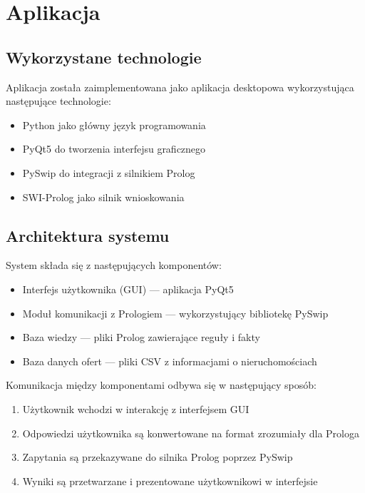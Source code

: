 \section{Aplikacja}

\subsection{Wykorzystane technologie}

Aplikacja została zaimplementowana jako aplikacja desktopowa wykorzystująca następujące technologie:
\begin{itemize}
    \item Python jako główny język programowania
    \item PyQt5 do tworzenia interfejsu graficznego
    \item PySwip do integracji z silnikiem Prolog
    \item SWI-Prolog jako silnik wnioskowania
\end{itemize}

\subsection{Architektura systemu}

System składa się z następujących komponentów:
\begin{itemize}
    \item Interfejs użytkownika (GUI) — aplikacja PyQt5
    \item Moduł komunikacji z Prologiem — wykorzystujący bibliotekę PySwip
    \item Baza wiedzy — pliki Prolog zawierające reguły i fakty
    \item Baza danych ofert — pliki CSV z informacjami o nieruchomościach
\end{itemize}

\noindent
Komunikacja między komponentami odbywa się w następujący sposób:
\begin{enumerate}
    \item Użytkownik wchodzi w interakcję z interfejsem GUI
    \item Odpowiedzi użytkownika są konwertowane na format zrozumiały dla Prologa
    \item Zapytania są przekazywane do silnika Prolog poprzez PySwip
    \item Wyniki są przetwarzane i prezentowane użytkownikowi w interfejsie
\end{enumerate}

